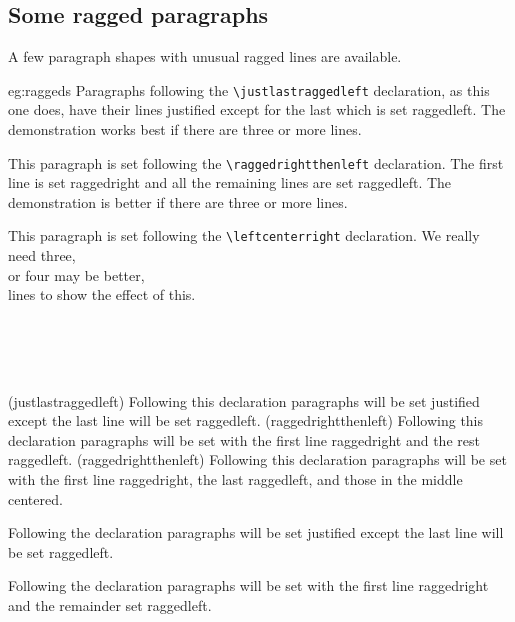 \subsection{Some ragged paragraphs}

   A few paragraph shapes with unusual ragged lines are available.

\begin{egresult}{eg:raggeds}
\justlastraggedleft
Paragraphs following the \verb?\justlastraggedleft? declaration, as
this one does, have their lines justified except for the last which
is set raggedleft. The demonstration works best if there are three
or more lines.

\raggedrightthenleft
This paragraph is set following the \verb?\raggedrightthenleft?
declaration. The first line is set raggedright and all the remaining
lines are set raggedleft. The demonstration is better if there are three or 
more lines.

\leftcenterright
This paragraph is set following the \verb?\leftcenterright?
declaration. We really need three, \\ or four may be better, \\
lines to show the effect of this.
\everypar{}
\end{egresult}



\begin{syntax}
\cmd{\justlastraggedleft} \\
\cmd{\raggedrightthenleft} \\
\cmd{\leftcenterright} \\
\end{syntax}
\glossary(justlastraggedleft)%
  {}%
  {Following this declaration paragraphs will be set justified except the
  last line will be set raggedleft.}
\glossary(raggedrightthenleft)%
  {}%
  {Following this declaration paragraphs will be
set with the first line raggedright and the rest raggedleft.}
\glossary(raggedrightthenleft)%
  {}%
  {Following this declaration paragraphs will be
set with the first line raggedright, the last raggedleft, and those
 in the middle centered.}

  Following the \cmd{\justlastraggedleft}  declaration paragraphs will be 
set justified except the last line will be set raggedleft.

  Following the declaration \cmd{\raggedrightthenleft} paragraphs will be
set with the first line raggedright and the remainder set raggedleft.

